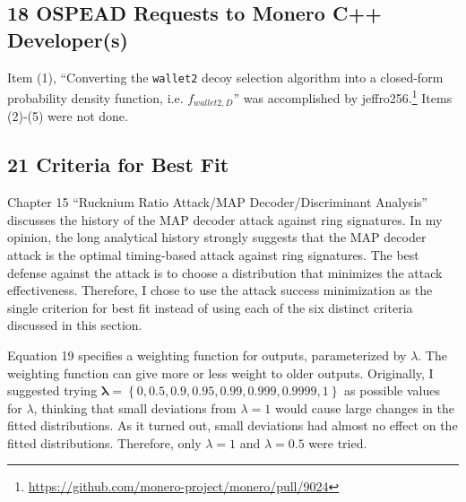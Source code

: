 \documentclass[english]{article}
\begin{document}
\subsection*{18 OSPEAD Requests to Monero C++ Developer(s)}

Item (1), ``Converting the \texttt{wallet2} decoy selection algorithm
into a closed-form probability density function, i.e. $f_{wallet2,D}$''
was accomplished by jeffro256.\footnote{\href{https://github.com/monero-project/monero/pull/9024}{https://github.com/monero-project/monero/pull/9024}}
Items (2)-(5) were not done.

\subsection*{21 Criteria for Best Fit}

Chapter 15 ``Rucknium Ratio Attack/MAP Decoder/Discriminant Analysis''
discusses the history of the MAP decoder attack against ring signatures.
In my opinion, the long analytical history strongly suggests that
the MAP decoder attack is the optimal timing-based attack against
ring signatures. The best defense against the attack is to choose
a distribution that minimizes the attack effectiveness. Therefore,
I chose to use the attack success minimization as the single criterion
for best fit instead of using each of the six distinct criteria discussed
in this section.

Equation 19 specifies a weighting function for outputs, parameterized
by $\lambda$. The weighting function can give more or less weight
to older outputs. Originally, I suggested trying $\boldsymbol{\lambda}=\left\{ 0,0.5,0.9,0.95,0.99,0.999,0.9999,1\right\} $
as possible values for $\lambda$, thinking that small deviations
from $\lambda=1$ would cause large changes in the fitted distributions.
As it turned out, small deviations had almost no effect on the fitted
distributions. Therefore, only $\lambda=1$ and $\lambda=0.5$ were
tried.
\end{document}
